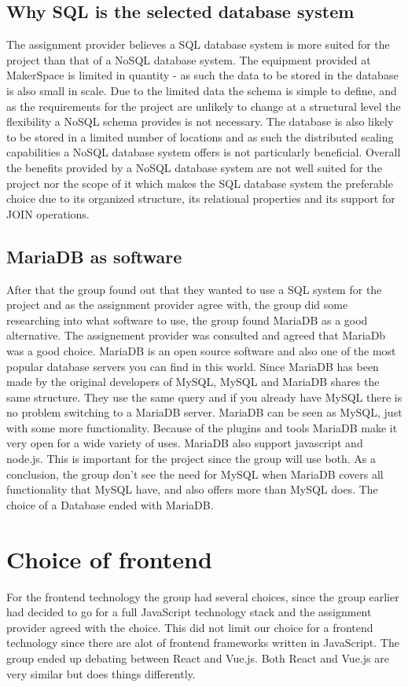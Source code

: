 \subsection{Why SQL is the selected database system}
The assignment provider believes a SQL database system is more suited for the project than that of a NoSQL database system.
The equipment provided at MakerSpace is limited in quantity - as such the data to be stored in the database is also small in scale.
Due to the limited data the schema is simple to define, and as the requirements for the project are unlikely to change at a structural level the flexibility a NoSQL schema provides is not necessary.
The database is also likely to be stored in a limited number of locations and as such the distributed scaling capabilities a NoSQL database system offers is not particularly beneficial.
Overall the benefits provided by a NoSQL database system are not well suited for the project nor the scope of it which makes the SQL database system the preferable choice due to its organized structure, its relational properties and its support for JOIN operations.

\subsection{MariaDB as software}
After that the group found out that they wanted to use a SQL system for the project and as the assignment provider 
agree with, the group did some researching into what software to use, the group found MariaDB as a good alternative. The assignement provider was consulted and agreed that MariaDb was a good choice. MariaDB is an open source software and also one of the most popular database servers you can find in this world. Since MariaDB has been made by the original developers of MySQL, MySQL and MariaDB shares the same structure. They use the same query and if you already have MySQL there is no problem switching to a MariaDB server. MariaDB can be seen as MySQL, just with some more functionality. Because of the plugins and tools MariaDB make it very open for a wide variety of uses. MariaDB also support javascript and node.js. This is important for the project since the group will use both. As a conclusion, the group don't see the need for MySQL when MariaDB covers all functionality that MySQL have, and also offers more than MySQL does. The choice of a Database ended with MariaDB.\cite{mariadb_1}\cite{mariadb_2}

\section{Choice of frontend} 
For the frontend technology the group had several choices, since the group earlier had decided to go for a full JavaScript technology stack and the assignment provider agreed with the choice. This did not limit our choice for a frontend technology since there are alot of frontend frameworks written in JavaScript. The group ended up debating between React and Vue.js. Both React and Vue.js are very similar but does things differently. 

